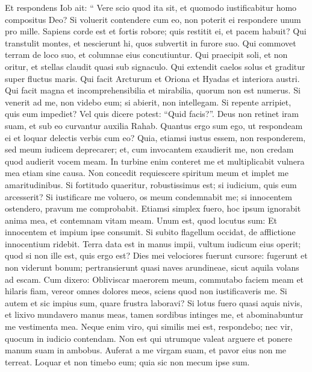 \begin{biblechapter}
\begin{biblechapter}
\begin{biblechapter}
\begin{biblechapter}
\begin{biblechapter}
\begin{biblechapter}
\begin{biblechapter}
\begin{biblechapter}
\begin{biblechapter}
\verse Et respondens Iob ait:
 \verse “ Vere scio quod ita sit,
 et quomodo iustificabitur homo compositus Deo?
 \verse Si voluerit contendere cum eo,
 non poterit ei respondere unum pro mille.
 \verse Sapiens corde est et fortis robore;
 quis restitit ei, et pacem habuit?
 \verse Qui transtulit montes, et nescierunt hi, quos subvertit in furore suo.
 \verse Qui commovet terram de loco suo,
 et columnae eius concutiuntur.
 \verse Qui praecipit soli, et non oritur,
 et stellas claudit quasi sub signaculo.
 \verse Qui extendit caelos solus
 et graditur super fluctus maris.
 \verse Qui facit Arcturum et Oriona
 et Hyadas et interiora austri.
 \verse Qui facit magna et incomprehensibilia
 et mirabilia, quorum non est numerus.
 \verse Si venerit ad me, non videbo eum;
 si abierit, non intellegam.
 \verse Si repente arripiet, quis eum impediet?
 Vel quis dicere potest: “Quid facis?”.
 \verse Deus non retinet iram suam,
 et sub eo curvantur auxilia Rahab. 
\verse Quantus ergo sum ego, ut respondeam ei
 et loquar delectis verbis cum eo?
 \verse Quia, etiamsi iustus essem, non responderem,
 sed meum iudicem deprecarer;
 \verse et, cum invocantem exaudierit me,
 non credam quod audierit vocem meam.
 \verse In turbine enim conteret me
 et multiplicabit vulnera mea etiam sine causa.
 \verse Non concedit requiescere spiritum meum
 et implet me amaritudinibus.
 \verse Si fortitudo quaeritur, robustissimus est;
 si iudicium, quis eum arcesserit?
 \verse Si iustificare me voluero, os meum condemnabit me;
 si innocentem ostendero, pravum me comprobabit.
 \verse Etiamsi simplex fuero, hoc ipsum ignorabit anima mea,
 et contemnam vitam meam.
 \verse Unum est, quod locutus sum:
 Et innocentem et impium ipse consumit.
 \verse Si subito flagellum occidat,
 de afflictione innocentium ridebit. 
\verse Terra data est in manus impii,
 vultum iudicum eius operit;
 quod si non ille est, quis ergo est?
 \verse Dies mei velociores fuerunt cursore:
 fugerunt et non viderunt bonum;
 \verse pertransierunt quasi naves arundineae,
 sicut aquila volans ad escam.
 \verse Cum dixero: Obliviscar maerorem meum,
 commutabo faciem meam et hilaris fiam,
 \verse vereor omnes dolores meos,
 sciens quod non iustificaveris me.
 \verse Si autem et sic impius sum,
 quare frustra laboravi?
 \verse Si lotus fuero quasi aquis nivis,
 et lixivo mundavero manus meas,
 \verse tamen sordibus intinges me,
 et abominabuntur me vestimenta mea.
 \verse Neque enim viro, qui similis mei est, respondebo;
 nec vir, quocum in iudicio contendam.
 \verse Non est qui utrumque valeat arguere
 et ponere manum suam in ambobus.
 \verse Auferat a me virgam suam,
 et pavor eius non me terreat.
 \verse Loquar et non timebo eum;
 quia sic non mecum ipse sum.
 

\end{biblechapter}
\end{biblechapter}
\end{biblechapter}
\end{biblechapter}
\end{biblechapter}
\end{biblechapter}
\end{biblechapter}
\end{biblechapter}
\end{biblechapter}
